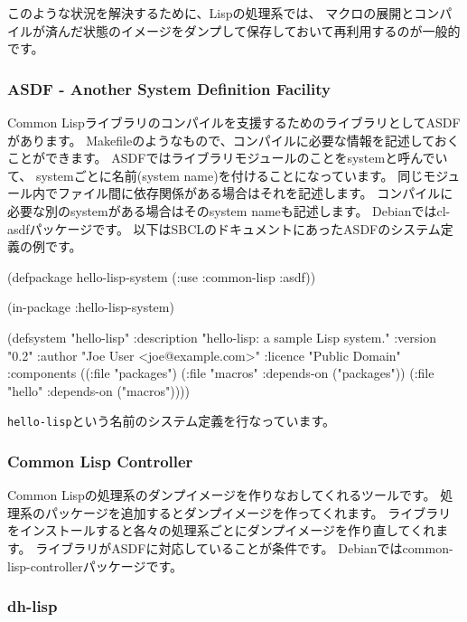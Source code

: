 \documentclass[mingoth,a4paper]{jsarticle}
\begin{document}
このような状況を解決するために、Lispの処理系では、
マクロの展開とコンパイルが済んだ状態のイメージをダンプして保存しておいて再利用するのが一般的です。

\subsubsection{ASDF - Another System Definition Facility}

Common Lispライブラリのコンパイルを支援するためのライブラリとしてASDFがあります。
Makefileのようなもので、コンパイルに必要な情報を記述しておくことができます。
ASDFではライブラリモジュールのことをsystemと呼んでいて、
systemごとに名前(system name)を付けることになっています。
同じモジュール内でファイル間に依存関係がある場合はそれを記述します。
コンパイルに必要な別のsystemがある場合はそのsystem nameも記述します。
Debianではcl-asdfパッケージです。
以下はSBCLのドキュメントにあったASDFのシステム定義の例です。

\begin{commandline}
    (defpackage hello-lisp-system
      (:use :common-lisp :asdf))

    (in-package :hello-lisp-system)

    (defsystem "hello-lisp"
        :description "hello-lisp: a sample Lisp system."
        :version "0.2"
        :author "Joe User <joe@example.com>"
        :licence "Public Domain"
        :components ((:file "packages")
                     (:file "macros" :depends-on ("packages"))
                     (:file "hello" :depends-on ("macros"))))
\end{commandline}

\verb|hello-lisp|という名前のシステム定義を行なっています。

\subsubsection{Common Lisp Controller}

Common Lispの処理系のダンプイメージを作りなおしてくれるツールです。
処理系のパッケージを追加するとダンプイメージを作ってくれます。
ライブラリをインストールすると各々の処理系ごとにダンプイメージを作り直してくれます。
ライブラリがASDFに対応していることが条件です。
Debianではcommon-lisp-controllerパッケージです。

\subsubsection{dh-lisp}
\end{document}

